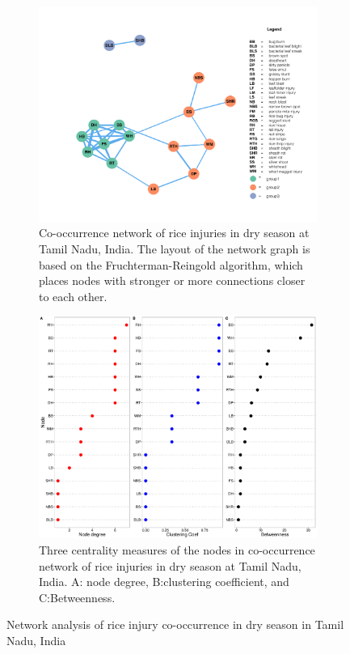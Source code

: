 \begin{figure}
    \centering
    \begin{subfigure}[b]{1\textwidth}
        \includegraphics[width = 1\textwidth]{figures/networkTM_ds/networkTM_ds.pdf}
        \caption{Co-occurrence network of rice injuries in dry season at Tamil Nadu, India. The layout of the network graph is based on the Fruchterman-Reingold algorithm, which places nodes with stronger or more connections closer to each other.}
        \label{fig:networkTM_ds}
    \end{subfigure}
    \begin{subfigure}[b]{1\textwidth}
        \includegraphics[width = 1\textwidth]{figures/nodepropTM_ds/nodepropTM_ds.pdf}
        \caption{Three centrality measures of the nodes in co-occurrence network of rice injuries in dry season at Tamil Nadu, India. A: node degree, B:clustering coefficient, and C:Betweenness.}
        \label{fig:nodepropTM_ds}
    \end{subfigure}
    \caption{Network analysis of rice injury co-occurrence in dry season in Tamil Nadu, India}
    \label{fig:TM_ds}
\end{figure}

